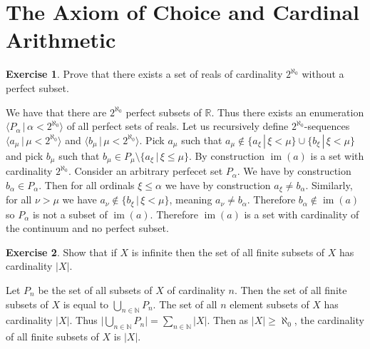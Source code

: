 \documentclass{article}
\theoremstyle{definition}
\newtheorem{exer}{Exercise}[section]
\newcommand{\N}{\mathbb{N}}
\newcommand{\R}{\mathbb{R}}
\DeclareMathOperator{\im}{im}
\newcommand{\abs}[1]{\lvert#1\rvert}
\newlength{\defparindent}
\newenvironment{answer}
    {\begin{mdframed}[backgroundcolor=gray!15, linewidth=0pt] \setlength{\parindent}{\defparindent}}
    {\end{mdframed}}
\begin{document}
\newpage

\section{The Axiom of Choice and Cardinal Arithmetic}

\begin{exer}
    Prove that there exists a set of reals of cardinality $2^{\aleph_0}$ without a perfect subset.
    \begin{answer}
        We have that there are $2^{\aleph_0}$ perfect subsets of $\R$. Thus there exists an enumeration $\langle P_\alpha \, | \, \alpha < 2^{\aleph_0} \rangle$ of all perfect sets of reals. Let us recursively define $2^{\aleph_0}$-sequences $\langle a_\mu \, | \, \mu < 2^{\aleph_0} \rangle$ and $\langle b_\mu \, | \, \mu < 2^{\aleph_0} \rangle$. Pick $a_\mu$ such that $a_\mu \not\in \{a_\xi \, | \, \xi < \mu\} \cup \{b_\xi \, | \, \xi < \mu\}$ and pick $b_\mu$ such that $b_\mu \in P_\mu \setminus \{ a_\xi \, | \, \xi \le \mu \}$. By construction $\im(a)$ is a set with cardinality $2^{\aleph_0}$. Consider an arbitrary perfecet set $P_\alpha$. We have by construction $b_\alpha \in P_\alpha$. Then for all ordinals $\xi \le \alpha$ we have by construction $a_\xi \ne b_\alpha$. Similarly, for all $\nu > \mu$ we have $a_\nu \not\in \{b_\xi \, | \, \xi < \mu\}$, meaning $a_\nu \ne b_\alpha$. Therefore $b_\alpha \not\in \im(a)$ so $P_\alpha$ is not a subset of $\im(a)$. Therefore $\im(a)$ is a set with cardinality of the continuum and no perfect subset.
    \end{answer}
\end{exer}

\begin{exer}
    Show that if $X$ is infinite then the set of all finite subsets of $X$ has cardinality $\abs{X}$.
    \begin{answer}
        Let $P_n$ be the set of all subsets of $X$ of cardinality $n$. Then the set of all finite subsets of $X$ is equal to $\bigcup_{n \in \N} P_n$. The set of all $n$ element subsets of $X$ has cardinality $\abs{X}$. Thus $\abs{\bigcup_{n \in \N} P_n} = \sum_{n \in \N} \abs{X}$. Then as $\abs{X} \ge \aleph_0$, the cardinality of all finite subsets of $X$ is $\abs{X}$.
    \end{answer}
\end{exer}
\end{document}
